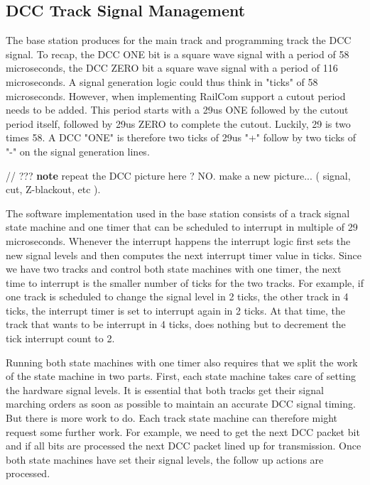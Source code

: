 \subsection{DCC Track Signal Management}

The base station produces for the main track and programming track the DCC signal. To recap, the DCC ONE bit is a square wave signal with a period of 58 microseconds, the DCC ZERO bit a square wave signal with a period of 116 microseconds. A signal generation logic could thus think in "ticks" of 58 microseconds. However, when implementing RailCom support a cutout period needs to be added. This period starts with a 29us ONE followed by the cutout period itself, followed by 29us ZERO to complete the cutout. Luckily, 29 is two times 58. A DCC "ONE" is therefore two ticks of 29us "+" follow by two ticks of "-" on the signal generation lines.

// ??? \textbf{note} repeat the DCC picture here ? NO. make a new picture... ( signal, cut, Z-blackout, etc ).

The software implementation used in the base station consists of a track signal state machine and one timer that can be scheduled to interrupt in multiple of 29 microseconds. Whenever the interrupt happens  the interrupt logic first sets the new signal levels and then computes the next interrupt timer value in ticks. Since we have two tracks and control both state machines with one timer, the next time to interrupt is the smaller number of ticks for the two tracks. For example, if one track is scheduled to change the signal level in 2 ticks, the other track in 4 ticks, the interrupt timer is set to interrupt again in 2 ticks. At that time, the track that wants to be interrupt in 4 ticks, does nothing but to decrement the tick interrupt count to 2.

Running both state machines with one timer also requires that we split the work of the state machine in two parts. First, each state machine takes care of setting the hardware signal levels. It is essential that both tracks get their signal marching orders as soon as possible to maintain an accurate DCC signal timing. But there is more work to do. Each track state machine can therefore might request some further work. For example, we need to get the next DCC packet bit and if all bits are processed the next DCC packet lined up for transmission. Once both state machines have set their signal levels, the follow up actions are processed.

